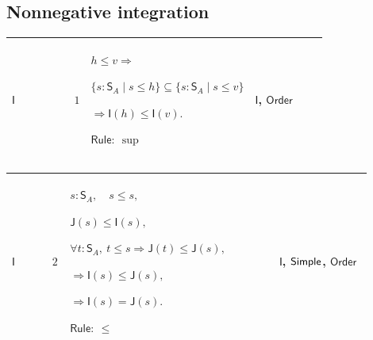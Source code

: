 \documentclass[12pt,reqno]{amsart}
\theoremstyle{blueplain}
\numberwithin{equation}{section}
\newlength{\FATOUOneColumnBody}
\begin{document}
\subsection{\protect\scriptsize Nonnegative integration}

{\scriptsize \setlength{\parskip}{0pt}\nointerlineskip
\noindent 
\begin{tabular}{|@{}>{\centering\arraybackslash}m{\FATOUOneColumnBody}|}
\hline
$\displaystyle \mathsf{Context\_I}:=$\par$\displaystyle h,v:\mathsf{F}.$ \\ 
\hline
\end{tabular}%
}

{\scriptsize \setlength{\parskip}{0pt}\nointerlineskip
\noindent 
\begin{tabular}{|@{}>{\centering\arraybackslash}m{0.10658\linewidth}|>{\centering\arraybackslash}m{0.03553\linewidth}|>{\centering\arraybackslash}m{0.52105\linewidth}|>{\centering\arraybackslash}m{0.23684\linewidth}|}
\hline
\hypertarget{proof:I1}{$\displaystyle \mathsf{I}$} & $\displaystyle 1$ & $%
\displaystyle h\le v\Rightarrow$\par$\displaystyle \{s:\mathsf{S}_A\mid s\le
h\}\subseteq\{s:\mathsf{S}_A\mid s\le v\}$\par$\displaystyle \Rightarrow%
\mathsf{I}(h)\le\mathsf{I}(v).$\par$\displaystyle \mathsf{Rule}:\ \sup$ & 
\hyperlink{def:I}{$\displaystyle \mathsf{I}$}, \hyperlink{ax:Order}{$%
\displaystyle \mathsf{Order}$} \\ \hline
\end{tabular}%
}

{\scriptsize \setlength{\parskip}{0pt}\nointerlineskip
\noindent 
\begin{tabular}{|@{}>{\centering\arraybackslash}m{0.10658\linewidth}|>{\centering\arraybackslash}m{0.03553\linewidth}|>{\centering\arraybackslash}m{0.52105\linewidth}|>{\centering\arraybackslash}m{0.23684\linewidth}|}
\hline
\hypertarget{proof:I2}{$\displaystyle \mathsf{I}$} & $\displaystyle 2$ & $%
\displaystyle s:\mathsf{S}_A,\quad s\le s,$\par$\displaystyle \mathsf{J}%
(s)\le\mathsf{I}(s),$\par$\displaystyle \forall t:\mathsf{S}_A,\ t\le
s\Rightarrow\mathsf{J}(t)\le\mathsf{J}(s),$\par$\displaystyle \Rightarrow%
\mathsf{I}(s)\le\mathsf{J}(s),$\par$\displaystyle \Rightarrow\mathsf{I}(s)=%
\mathsf{J}(s).$\par$\displaystyle \mathsf{Rule}:\ \le$ & \hyperlink{def:I}{$%
\displaystyle \mathsf{I}$}, \hyperlink{lem:Simple}{$\displaystyle \mathsf{%
Simple}$}, \hyperlink{ax:Order}{$\displaystyle \mathsf{Order}$} \\ \hline
\end{tabular}%
}
\end{document}
